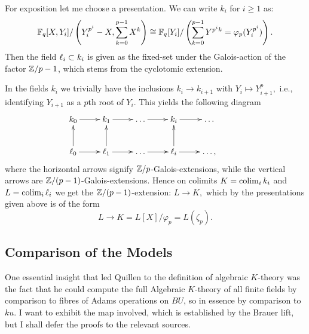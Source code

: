 \label{myfields}
For exposition let me choose a presentation. We can write $k_i$ for 
$i\geq1$ as:\[\mathbb{F}_q[X,Y_i]/\left(Y_i^{p^i}-X,\sum_{k=0}^{p-1}
X^k\right)\cong\mathbb{F}_q[Y_i]/\left(\sum_{k=0}^{p-1}Y^{p^ik}
=\varphi_p(Y_i^{p^i})\right).\] Then the field $\ell_i\subset k_i$ is 
given as the fixed-set under the Galois-action of 
the factor $\mathbb{Z}/p-1$, which stems from the cyclotomic extension.

In the fields $k_i$ we trivially have the inclusions $k_i\rightarrow k_{i+1}$
with $Y_i\mapsto Y^p_{i+1},$ i.e., identifying $Y_{i+1}$ as a $p$th root
of $Y_i$. This yields the following diagram
\[\xymatrix{ k_0\ar[r] & k_1\ar[r] &\ldots \ar[r]& k_i \ar[r]&\ldots& \\
\l_0 \ar[u]\ar[r] & \l_1\ar[r]\ar[u] &\ldots\ar[r] & \l_i\ar[r]\ar[u] &\ldots,&}\] 
where the horizontal arrows signify $\mathbb{Z}/p$-Galois-extensions, while
the vertical arrows are $\mathbb{Z}/(p-1)$-Galois-extensions. Hence on colimits
$K=\operatorname{colim}_i k_i$ and $L=\operatorname{colim}_i \ell_i$ we get the $\mathbb{Z}/(p-1)$-extension:
$L\rightarrow K,$ which by the presentations given above is
of the form \[L\rightarrow K=L[X]/\varphi_p =L(\zeta_p).\]

{}

{}

\subsection*{Comparison of the Models}
One essential insight that led Quillen to the definition of algebraic
$K$-theory \cite{Q1971,Q1972,Q1973} was the fact that he could compute
the full Algebraic $K$-theory of all finite fields by comparison to
fibres of Adams operations on $BU$, so in essence by comparison to
$ku$. I want to exhibit the map involved, which is established by the
Brauer lift, but I shall defer the proofs to the relevant sources.

